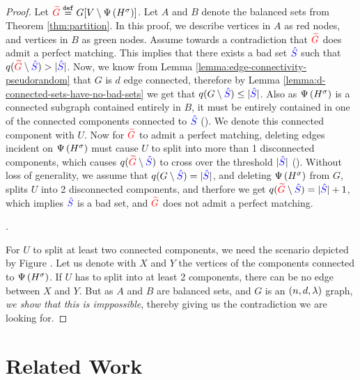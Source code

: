 \documentclass[11pt]{article}
\begin{document}
\begin{proof}Let $\textcolor{red}{\widetilde{G}} \text{}\overset{\mathtt{def}}{=}  G[V \setminus \Psi\left({H}^{\sigma}\right)]$.
  Let $A$ and $B$ denote the balanced sets from Theorem \ref{thm:partition}.
  In this proof, we describe vertices in $A$ as red nodes, and vertices in $B$ as green nodes.
  Assume towards a contradiction that $\textcolor{red}{\widetilde{G}}$ does  admit a perfect matching.
This implies that there exists a bad set $\textcolor{blue}{\hat{S}}$ such that $q(\textcolor{red}{\widetilde{G}} \setminus \textcolor{blue}{\hat{S}}) > |\textcolor{blue}{\hat{S}}|$.
Now,  we know from Lemma \ref{lemma:edge-connectivity-pseudorandom} that $G$ is $d$ edge connected, therefore by Lemma \ref{lemma:d-connected-sets-have-no-bad-sets} we get that $q(G \setminus \textcolor{blue}{\hat{S}}) \leq |\textcolor{blue}{\hat{S}}|$.  
Also as $\Psi\left({H}^{\sigma}\right)$ is a connected subgraph contained entirely in $B$, it must be entirely contained in one of the connected components connected to $\textcolor{blue}{\hat{S}}$ ().
We denote this connected component with $U$.
Now for $\textcolor{red}{\widetilde{G}}$ to  admit a perfect matching, deleting edges incident on $\Psi\left({H}^{\sigma}\right)$ must cause $U$ to split into more than 1 disconnected components, which causes $q(\textcolor{red}{\widetilde{G}} \setminus \textcolor{blue}{\hat{S}})$ to cross over the threshold $|\textcolor{blue}{\hat{S}}|$ ().
Without loss of generality, we assume that $q(G \setminus \textcolor{blue}{\hat{S}}) = |\textcolor{blue}{\hat{S}}|$, and deleting $\Psi\left({H}^{\sigma}\right)$ from $G$, splits $U$ into 2 disconnected components, and therfore we get 
$q(\textcolor{red}{\widetilde{G}} \setminus \textcolor{blue}{\hat{S}}) =  |\textcolor{blue}{\hat{S}}|+1$, which implies $\textcolor{blue}{\hat{S}}$ is a bad set, and $\textcolor{red}{\widetilde{G}}$ does not admit a perfect matching.

.

For $U$ to split at least two connected components, we need the scenario depicted by Figure .
Let us denote with $X$ and $Y$ the vertices of the components connected to $\Psi\left({H}^{\sigma}\right)$.
If $U$ has to split into at least 2 components, there can be no edge between $X$ and $Y$.
But as $A$ and $B$ are balanced sets, and $G$ is an $(n, d, \lambda)$ graph, \textit{we show that this is imppossible}, thereby giving us the contradiction we are looking for.

\end{proof}

\section{Related Work}
\label{sec:related-work}
\end{document}
